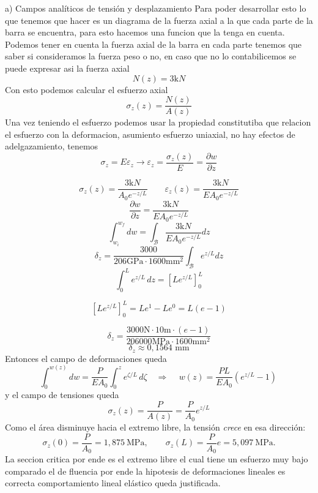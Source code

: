 
\begin{desarrollo}{a) Campos anal\'iticos de tensi\'on y desplazamiento}
    Para poder desarrollar esto lo que tenemos que hacer es un diagrama de la fuerza axial a la que cada parte de la barra se encuentra, para esto hacemos una funcion que la tenga en cuenta. Podemos tener en cuenta la fuerza axial de la barra en cada parte tenemos que saber si consideramos la fuerza peso o no, en caso que no lo contabilicemos se puede expresar asi la fuerza axial
    $$N(z)=3\text{k}N$$
    Con esto podemos calcular el esfuerzo axial
    $$\sigma_z(z)=\dfrac{N(z)}{A(z)}$$
    Una vez teniendo el esfuerzo podemos usar la propiedad constitutiba que relacion el esfuerzo con la deformacion, asumiento esfuerzo uniaxial, no hay efectos de adelgazamiento, tenemos 
    $$\sigma_z=E\varepsilon_z\longrightarrow \varepsilon_z=\dfrac{\sigma_z(z)}{E}=\dfrac{\partial w}{\partial z}$$
    
    $$\sigma_z(z)=\dfrac{3\text{k}N}{A_0e^{-z/L}}\quad \quad \varepsilon_z(z)=\dfrac{3\text{k}N}{EA_0e^{-z/L}}$$ 
    $$\dfrac{\partial w}{\partial z}=\dfrac{3\text{k}N}{EA_0e^{-z/L}}$$ 
    $$\int_{w_i}^{w_f} dw=\int_{\mathcal{B}}\dfrac{3\text{k}N}{EA_0e^{-z/L}}dz$$ 
    $$\delta_z=\dfrac{3000}{206\text{GPa}\cdot1600\text{mm}^2}\int_{\mathcal{B}}e^{z/L}dz$$
    $$\int_{0}^{L} e^{z/L} \, dz = \left[ L e^{z/L} \right]_{0}^{L}$$

$$\left[ L e^{z/L} \right]_{0}^{L} = L e^1 - L e^0 = L(e - 1)$$

$$\delta_z = \frac{3000 \text{N}\cdot 10\text{m}\cdot(e - 1)}{206000\text{MPa} \cdot 1600\text{mm}^2}$$
$$\delta_z \approx 0,1564\text{ mm}$$
Entonces el campo de deformaciones queda
$$\int_0^{w(z)}dw=\frac{P}{EA_0}\int_0^{z}e^{\zeta/L}\,d\zeta
\quad\Longrightarrow\quad
\boxed{\,w(z)=\frac{PL}{EA_0}\left(e^{z/L}-1\right)\,}$$
y el campo de tensiones queda
$$\boxed{\,\sigma_z(z)=\frac{P}{A(z)}=\frac{P}{A_0}e^{z/L}\,}$$
Como el \'area disminuye hacia el extremo libre, la tensi\'on \emph{crece} en esa
direcci\'on:
$$\sigma_z(0)=\frac{P}{A_0}=1{,}875\ \text{MPa},\qquad
\sigma_z(L)=\frac{P}{A_0}e=5{,}097\ \text{MPa}.$$
La seccion critica por ende es el extremo libre el cual tiene un esfuerzo muy bajo comparado el de fluencia por ende la hipotesis de deformaciones lineales es correcta
comportamiento lineal el\'astico queda justificada.
\end{desarrollo}

